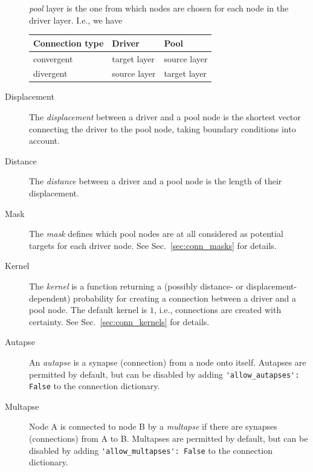 \documentclass[a4paper,12pt]{report}
\begin{document}
\begin{description}
  \emph{pool} layer is the one from which nodes are chosen for each
  node in the driver layer. I.e., we have\\
  \begin{tabular}{l||l|l}
  Connection type  & Driver & Pool \\\hline\hline
  convergent  & target layer & source layer \\\hline
  divergent   & source layer & target layer
  \end{tabular}
\item[Displacement\index{displacement}] The \emph{displacement}
  between a driver and a pool node is the shortest vector connecting
  the driver to the pool node, taking
  boundary conditions into account.
\item[Distance\index{distance}] The \emph{distance} between a driver
  and a pool node is the length of their displacement.
\item[Mask\index{mask}] The \emph{mask} defines which pool nodes are
  at all considered as potential targets for each driver node. See
  Sec.~\ref{sec:conn_masks} for details.
\item[Kernel\index{kernel}] The \emph{kernel} is a function returning
  a (possibly distance- or displacement-dependent)
  probability for creating a connection between a driver and a pool
  node. The default kernel is $1$, i.e., connections are created with
  certainty. See Sec.~\ref{sec:conn_kernels} for details.
\item[Autapse\index{autapse}] An \emph{autapse} is a synapse (connection) from a
  node onto itself. Autapses are permitted by default, but can be
  disabled by adding \lstinline!'allow_autapses': False! to the
  connection dictionary.
\item[Multapse\index{multapse}] Node A is connected to node B by a
  \emph{multapse} if there are synapses (connections) from A to
  B. Multapses are permitted by default, but can be disabled by adding
  \lstinline!'allow_multapses': False! to the connection dictionary.
\end{description}
\end{document}
